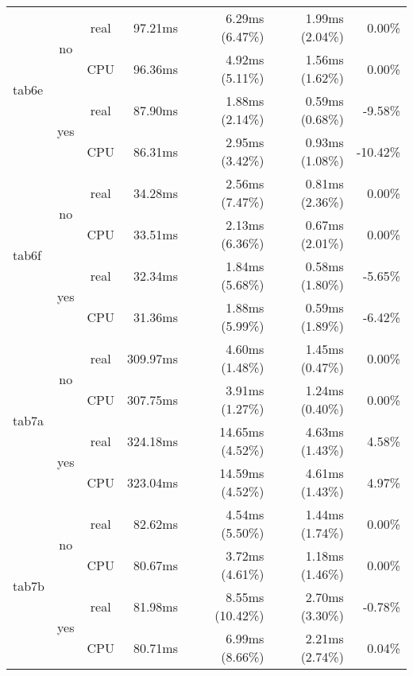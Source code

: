 \documentclass[en]{pracamgr}
\begin{document}
\begin{small}
\begin{longtable}{|l|c|c|r|r|r|r|}
\hline
\multirow{4}{*}{tab6e}    & \multirow{2}{*}{no}  & real & 97.21ms & 6.29ms (6.47\%) & 1.99ms (2.04\%) & 0.00\% \\*
                          &                      & CPU  & 96.36ms & 4.92ms (5.11\%) & 1.56ms (1.62\%) & 0.00\% \\*
                          \cline{2-7}
                          & \multirow{2}{*}{yes} & real & 87.90ms & 1.88ms (2.14\%) & 0.59ms (0.68\%) & -9.58\% \\*
                          &                      & CPU  & 86.31ms & 2.95ms (3.42\%) & 0.93ms (1.08\%) & -10.42\% \\
\hline
\multirow{4}{*}{tab6f}    & \multirow{2}{*}{no}  & real & 34.28ms & 2.56ms (7.47\%) & 0.81ms (2.36\%) & 0.00\% \\*
                          &                      & CPU  & 33.51ms & 2.13ms (6.36\%) & 0.67ms (2.01\%) & 0.00\% \\*
                          \cline{2-7}
                          & \multirow{2}{*}{yes} & real & 32.34ms & 1.84ms (5.68\%) & 0.58ms (1.80\%) & -5.65\% \\*
                          &                      & CPU  & 31.36ms & 1.88ms (5.99\%) & 0.59ms (1.89\%) & -6.42\% \\
\hline
\multirow{4}{*}{tab7a}    & \multirow{2}{*}{no}  & real & 309.97ms & 4.60ms (1.48\%) & 1.45ms (0.47\%) & 0.00\% \\*
                          &                      & CPU  & 307.75ms & 3.91ms (1.27\%) & 1.24ms (0.40\%) & 0.00\% \\*
                          \cline{2-7}
                          & \multirow{2}{*}{yes} & real & 324.18ms & 14.65ms (4.52\%) & 4.63ms (1.43\%) & 4.58\% \\*
                          &                      & CPU  & 323.04ms & 14.59ms (4.52\%) & 4.61ms (1.43\%) & 4.97\% \\
\hline
\multirow{4}{*}{tab7b}    & \multirow{2}{*}{no}  & real & 82.62ms & 4.54ms (5.50\%) & 1.44ms (1.74\%) & 0.00\% \\*
                          &                      & CPU  & 80.67ms & 3.72ms (4.61\%) & 1.18ms (1.46\%) & 0.00\% \\*
                          \cline{2-7}
                          & \multirow{2}{*}{yes} & real & 81.98ms & 8.55ms (10.42\%) & 2.70ms (3.30\%) & -0.78\% \\*
                          &                      & CPU  & 80.71ms & 6.99ms (8.66\%) & 2.21ms (2.74\%) & 0.04\% \\

\end{longtable}
\end{small}
\end{document}
